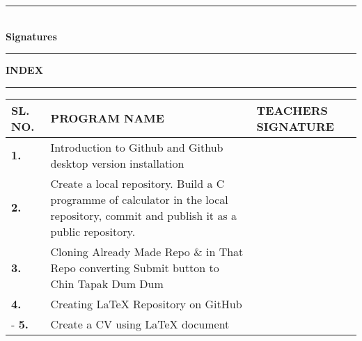 \documentclass[a4paper,14pt]{article}
\begin{document}
\vspace{2cm}

\begin{flushright}
\rule{5cm}{0.5pt} \\
\textbf{Signatures}
\end{flushright}

\newpage

\begin{center}
    \hrule height 0.5pt
    \vspace{0.3cm}
    {\LARGE \textbf{INDEX}} \\ 
    \vspace{0.3cm}
    \hrule height 0.5pt
\end{center}

\vspace{1cm}

\begin{center}
    \begin{tabular}{|>{\centering\arraybackslash}p{1.5cm}|p{10.5cm}|>{\centering\arraybackslash}p{3cm}|}
        \hline
        \vspace{0.1cm}
        \textbf{SL. NO.} & \vspace{0.1cm} \textbf{PROGRAM NAME} & \vspace{0.1cm} \textbf{TEACHERS SIGNATURE} \vspace{0.1cm} \\ 
        \hline
        \vspace{0.5cm}
        \textbf{1.} & \vspace{0.5cm} Introduction to Github and Github desktop version installation \vspace{0.5cm} &  \\ 
        \hline
        \vspace{0.5cm}
        \textbf{2.} & \vspace{0.5cm} Create a local repository. Build a C programme of calculator in the local repository, commit and publish it as a public repository. \vspace{0.5cm} &  \\ 
        \hline
        \textbf{3.} & \vspace{0.5cm} Cloning Already Made Repo \& in That Repo converting Submit button to Chin Tapak Dum Dum \vspace{0.5cm} &  \\ 
        \hline
        \vspace{0.5cm}
        \textbf{4.} & \vspace{0.5cm} Creating LaTeX Repository on GitHub \vspace{0.5cm} &  \\ 
        \hline
        \vspace{0.5cm}-
        \textbf{5.} & \vspace{0.5cm} Create a CV using LaTeX document \vspace{0.5cm} &  \\ 
        \hline
    \end{tabular}
\end{center}
\end{document}
